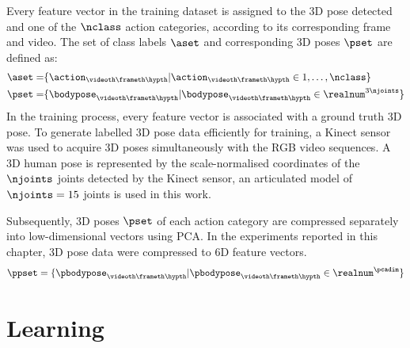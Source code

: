 Every feature vector in the training dataset is assigned to the 3D pose detected and one of the $\nclass$ action categories, according to its corresponding frame and video. 
The set of class labels $\aset$ and corresponding 3D poses $\pset$ are defined as: 
\begin{equation}
	\begin{aligned}
		\aset = & \{\action_{\videoth\frameth\hypth} | \action_{\videoth\frameth\hypth} \in 1,\dots,\nclass \} \\ 
		\pset = & \{\bodypose_{\videoth\frameth\hypth} | \bodypose_{\videoth\frameth\hypth} \in \realnum^{3\njoints}\}  
	\end{aligned}
\end{equation}
In the training process, every feature vector is associated with a ground truth 3D pose.
To generate labelled 3D pose data efficiently for training, a Kinect sensor was used to acquire 3D poses simultaneously with the RGB video sequences. A 3D human pose is represented by the scale-normalised coordinates of the $\njoints$ joints detected by the Kinect sensor, an articulated model of $\njoints=15$ joints is used in this work. 

Subsequently, 3D poses $\pset$ of each action category are compressed separately into low-dimensional vectors using PCA. 
In the experiments reported in this chapter, 3D pose data were compressed to 6D feature vectors.  
\begin{equation}
	\ppset = \{\pbodypose_{\videoth\frameth\hypth}  | \pbodypose_{\videoth\frameth\hypth} \in \realnum^{\pcadim} \}
\end{equation}           

\section{Learning} 

